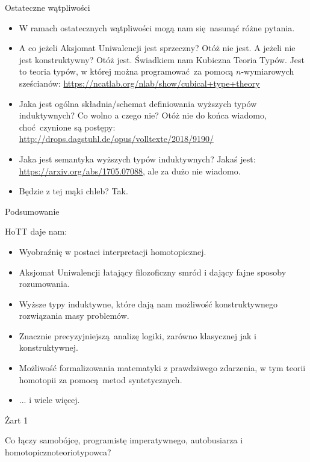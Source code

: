 \documentclass{beamer}
\begin{document}
\begin{frame}{Ostateczne wątpliwości}
\begin{itemize}
	\item W ramach ostatecznych wątpliwości mogą nam się nasunąć różne pytania.
	\item A co jeżeli Aksjomat Uniwalencji jest sprzeczny? Otóż nie jest. A jeżeli nie jest konstruktywny? Otóż jest. Świadkiem nam Kubiczna Teoria Typów. Jest to teoria typów, w której można programować za pomocą $n$-wymiarowych sześcianów: \url{https://ncatlab.org/nlab/show/cubical+type+theory}
	\item Jaka jest ogólna składnia/schemat definiowania wyższych typów induktywnych? Co wolno a czego nie? Otóż nie do końca wiadomo, choć czynione są postępy: \url{http://drops.dagstuhl.de/opus/volltexte/2018/9190/}
	\item Jaka jest semantyka wyższych typów induktywnych? Jakaś jest: \url{https://arxiv.org/abs/1705.07088}, ale za dużo nie wiadomo.
	\item Będzie z tej mąki chleb? Tak.
\end{itemize}
\end{frame}

\begin{frame}{Podsumowanie}

HoTT daje nam:
\begin{itemize}
	\item Wyobraźnię w postaci interpretacji homotopicznej.
	\item Aksjomat Uniwalencji łatający filozoficzny smród i dający fajne sposoby rozumowania.
	\item Wyższe typy induktywne, które dają nam możliwość konstruktywnego rozwiązania masy problemów.
	\item Znacznie precyzyjniejszą analizę logiki, zarówno klasycznej jak i konstruktywnej.
	\item Możliwość formalizowania matematyki z prawdziwego zdarzenia, w tym teorii homotopii za pomocą metod syntetycznych.
	\item ... i wiele więcej.
\end{itemize}

\end{frame}

\begin{frame}{Żart 1}

Co łączy samobójcę, programistę imperatywnego, autobusiarza i homotopicznoteoriotypowca?

\end{frame}
\end{document}
